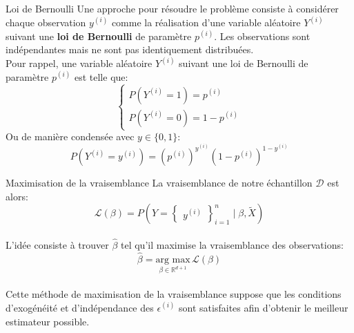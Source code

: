 \begin{frame}{Loi de Bernoulli}
	Une approche pour résoudre le problème consiste à considérer chaque observation ${y^{(i)}}$ comme la réalisation d'une variable aléatoire $Y^{(i)}$ suivant une \textbf{loi de Bernoulli} de paramètre $p^{(i)}$. Les observations sont indépendantes mais ne sont pas identiquement distribuées.\\
	\vspace{0.5cm}
	\pause
	Pour rappel, une variable aléatoire $Y^{(i)}$ suivant une loi de Bernoulli de paramètre $p^{(i)}$ est telle que:
	\begin{equation}
		\begin{cases}
			P(Y^{(i)} = 1) = p^{(i)} \\
			P(Y^{(i)} = 0) = 1 - p^{(i)}
		\end{cases}
		\nonumber
	\end{equation}
	Ou de manière condensée avec $y \in \{0, 1\}$:
	\begin{equation}
		P(Y^{(i)} = y^{(i)}) = \left(p^{(i)}\right)^{y^{(i)}} \left(1 - p^{(i)}\right)^{1 - y^{(i)}}
		\nonumber
	\end{equation}
\end{frame}

\begin{frame}{Maximisation de la vraisemblance}
	La vraisemblance de notre échantillon $\mathcal{D}$ est alors:
	\begin{equation}
		\mathcal{L}(\beta) = P(Y = \begin{Bmatrix}y^{(i)}\end{Bmatrix}_{i=1}^n \mid \beta, \tilde{X})
		\nonumber
	\end{equation} \\
	\vspace{0.5cm}
	\pause
	L'idée consiste à trouver $\hat{\beta}$ tel qu'il maximise la vraisemblance des observations:
	\begin{equation}
		\hat{\beta} = \underset{\beta \in \mathbb{R}^{d+1}}{\text{arg max}} \, \mathcal{L}(\beta)
		\nonumber
	\end{equation} \\
	\vspace{0.5cm}
	\pause
	Cette méthode de maximisation de la vraisemblance suppose que les conditions d'exogénéité et d'indépendance des $\epsilon^{(i)}$ sont satisfaites afin d'obtenir le meilleur estimateur possible.
\end{frame}

